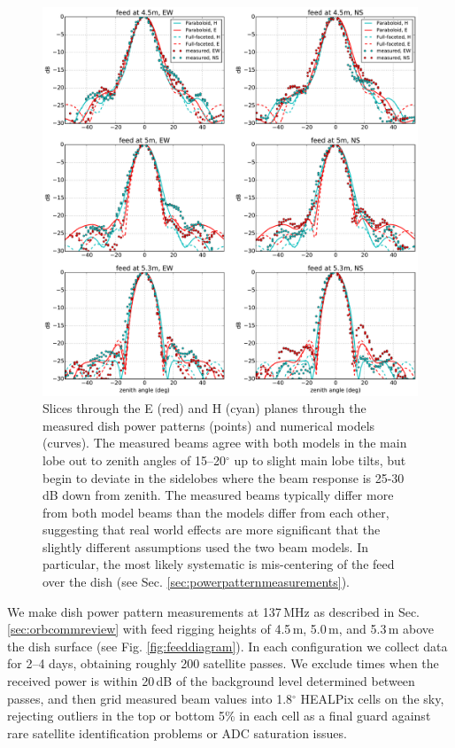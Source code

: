 \documentclass{emulateapj}
\begin{document}
\begin{figure}[t]
\centering
\includegraphics[width=6.5in]{measured_beams_and_models_slices.pdf}
\caption{Slices through the E (red) and H (cyan) planes through the measured dish power patterns (points) and numerical models (curves). The measured beams agree with both models in the main lobe out to zenith angles of 15--20$^\circ$ up to slight main lobe tilts, but begin to deviate in the sidelobes where the beam response is 25-30\,dB down from zenith. The measured beams typically differ more from both model beams than the models differ from each other, suggesting that real world effects are more significant that the slightly different assumptions used the two beam models. In particular, the most likely systematic is mis-centering of the feed over the dish (see Sec. \ref{sec:powerpatternmeasurements}).}
\label{fig:measuredbeamslices}
\end{figure}

We make dish power pattern measurements at 137\,MHz as described in Sec. \ref{sec:orbcommreview} with feed rigging heights of 4.5\,m, 5.0\,m, and 5.3\,m above the dish surface (see Fig. \ref{fig:feeddiagram}). In each configuration we collect data for 2--4 days, obtaining roughly 200 satellite passes. We exclude times when the received power is within 20\,dB of the background level determined between passes, and then grid measured beam values into 1.8$^\circ$ HEALPix cells on the sky, rejecting outliers in the top or bottom 5\% in each cell as a final guard against rare satellite identification problems or ADC saturation issues.
\end{document}
